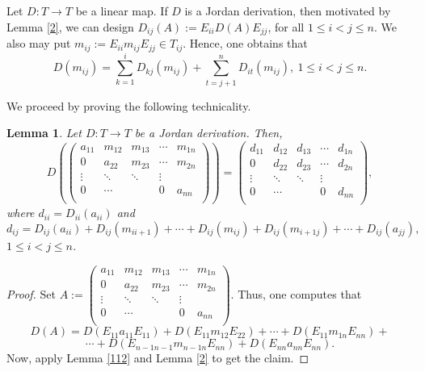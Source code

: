 \documentclass[12pt, reqno]{amsart}
\newtheorem{lemma}[theorem]{Lemma}
\theoremstyle{definition}
\numberwithin{equation}{section}
\begin{document}
Let $D: T \longrightarrow T$ be a linear map. If $D$ is a Jordan derivation, then motivated by Lemma \ref{2}, we can design $D_{ij}(A):=E_{ii}D(A)E_{jj}$, for all $1\leq i< j \leq n$. We also may put $m_{ij}:=E_{ii}m_{ij}E_{jj}\in T_{ij}$. Hence, one obtains that
$$D(m_{ij})=\sum_{k=1}^{i}D_{kj}(m_{ij})+\sum_{t=j+1}^nD_{it}(m_{ij}),\ 1\leq i< j \leq n.$$

We proceed by proving the following technicality.

\begin{lemma} Let $D: T \longrightarrow T$ be a Jordan derivation. Then, $$D\left(\left(
                               \begin{array}{ccccc}
                                 a_{11} &m_{12}&m_{13}&\cdots& m_{1n} \\
                                 0 & a_{22}&m_{23}&\cdots&m_{2n} \\
                                   \vdots &\ddots&\ddots&\vdots  \\
                                     0 &\cdots &&0&a_{nn} \\
                               \end{array}
                             \right)\right)=\left(
                               \begin{array}{ccccc}
                                d_{11} &d_{12}&d_{13}&\cdots& d_{1n} \\
                                 0 & d_{22}&d_{23}&\cdots&d_{2n} \\
                                   \vdots &\ddots&\ddots&\vdots  \\
                                     0 &\cdots &&0&d_{nn} \\
                               \end{array}
                             \right),$$ where $d_{ii}=D_{ii}(a_{ii})$ and $$d_{ij}=D_{ij}(a_{ii}) +D_{ij}(m_{ii+1}) +\cdots +D_{ij}(m_{ij})+D_{ij}(m_{i+1j})+\cdots +D_{ij}(a_{jj}),$$ $1\leq i< j\leq n$.
\end{lemma}

\begin{proof} Set $A:=\left(
                               \begin{array}{ccccc}
                                 a_{11} &m_{12}&m_{13}&\cdots& m_{1n} \\
                                 0 & a_{22}&m_{23}&\cdots&m_{2n} \\
                                   \vdots &\ddots&\ddots&\vdots  \\
                                     0 &\cdots &&0&a_{nn} \\
                               \end{array}
                             \right)$. Thus, one computes that $$D(A)=D(E_{11}a_{11}E_{11})+D(E_{11}m_{12}E_{22})+\cdots +D(E_{11}m_{1n}E_{nn})+$$$$\cdots +D(E_{n-1n-1}m_{n-1n}E_{nn})+D(E_{nn}a_{nn}E_{nn}).$$ Now, apply  Lemma \ref{112} and Lemma \ref{2} to get the claim.
\end{proof}
\end{document}
